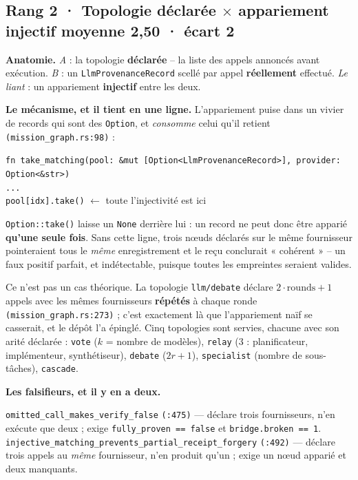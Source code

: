 \documentclass[10pt]{article}
\newcommand{\sz}[1]{{\small\color{grey}\textsf{#1}}}
\newcommand{\code}[1]{\texttt{\small #1}}
\newcommand{\x}{$\times$}
\newcommand{\loc}[1]{{\footnotesize\color{grey}\texttt{#1}}}
\newcommand{\couple}[4]{%
  \subsection{#1 · #2 \hfill {\normalsize\color{grey}moyenne \textbf{#3} · écart #4}}}
\begin{document}
\couple{Rang 2}{Topologie déclarée \x{} appariement injectif}{2,50}{2}

\textbf{Anatomie.} \emph{A} : la topologie \textbf{déclarée} -- la liste des appels annoncés avant
exécution. \emph{B} : un \code{LlmProvenanceRecord} scellé par appel \textbf{réellement} effectué.
\emph{Le liant} : un appariement \textbf{injectif} entre les deux.

\textbf{Le mécanisme, et il tient en une ligne.} L'appariement puise dans un vivier de records qui
sont des \code{Option}, et \emph{consomme} celui qu'il retient \loc{(mission\_graph.rs:98)} :

\begin{extrait}\small
\code{fn take\_matching(pool: \&mut [Option<LlmProvenanceRecord>], provider: Option<\&str>)}\\
\hspace*{2em}\code{...}\\
\hspace*{2em}\code{pool[idx].take()} \hfill \sz{$\leftarrow$ toute l'injectivité est ici}
\end{extrait}

\code{Option::take()} laisse un \code{None} derrière lui : un record ne peut donc être apparié
\textbf{qu'une seule fois}. Sans cette ligne, trois n\oe uds déclarés sur le même fournisseur
pointeraient tous le \emph{même} enregistrement et le reçu conclurait « cohérent » -- un faux positif
parfait, et indétectable, puisque toutes les empreintes seraient valides.

Ce n'est pas un cas théorique. La topologie \code{llm/debate} déclare $2 \cdot \text{rounds} + 1$
appels avec les mêmes fournisseurs \textbf{répétés} à chaque ronde \loc{(mission\_graph.rs:273)} ;
c'est exactement là que l'appariement naïf se casserait, et le dépôt l'a épinglé. Cinq topologies sont
servies, chacune avec son arité déclarée : \code{vote} \sz{($k$ = nombre de modèles)}, \code{relay}
\sz{(3 : planificateur, implémenteur, synthétiseur)}, \code{debate} \sz{($2r+1$)}, \code{specialist}
\sz{(nombre de sous-tâches)}, \code{cascade}.

\textbf{Les falsifieurs, et il y en a deux.}

\begin{extrait}\small
\code{omitted\_call\_makes\_verify\_false} \loc{(:475)} --- déclare trois fournisseurs, n'en exécute
que deux ; exige \code{fully\_proven == false} et \code{bridge.broken == 1}.\\[2pt]
\code{injective\_matching\_prevents\_partial\_receipt\_forgery} \loc{(:492)} --- déclare trois appels
au \emph{même} fournisseur, n'en produit qu'un ; exige un n\oe ud apparié et deux manquants.
\end{extrait}
\end{document}
